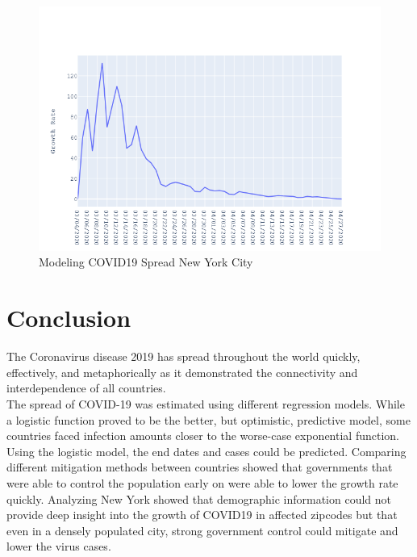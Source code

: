 \documentclass{homework}
\begin{document}
\begin{figure}[H]
  \centering
  \includegraphics[scale=0.45]{task5/task5_growthrate.png}
  \caption{Modeling COVID19 Spread New York City}
\end{figure}


\newpage
\section{Conclusion}

The Coronavirus disease 2019 has spread throughout the world quickly, effectively, and metaphorically as it demonstrated the connectivity and interdependence of all countries. \\

The spread of COVID-19 was estimated using different regression models. While a logistic function proved to be the better, but optimistic, predictive model, some countries faced infection amounts closer to the worse-case exponential function. Using the logistic model, the end dates and cases could be predicted. Comparing different mitigation methods between countries showed that governments that were able to control the population early on were able to lower the growth rate quickly. Analyzing New York showed that demographic information could not provide deep insight into the growth of COVID19 in affected zipcodes but that even in a densely populated city, strong government control could mitigate and lower the virus cases. \\

\newpage
\printbibliography[heading=bibintoc,title={References}]
\end{document}
